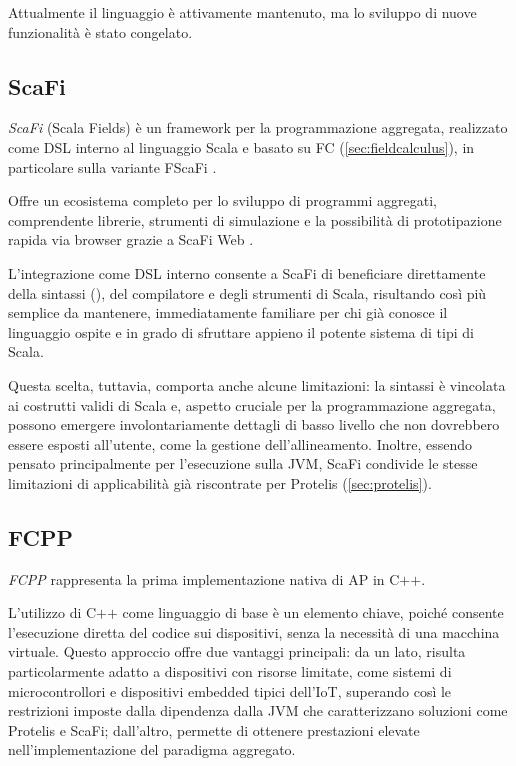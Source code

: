 Attualmente il linguaggio è attivamente mantenuto, ma lo sviluppo di nuove funzionalità è stato congelato.



\subsection{ScaFi}
\label{sec:scafi}

\emph{ScaFi} \cite{scafi} (Scala Fields) è un framework per la programmazione aggregata, realizzato come \ac{DSL} interno al linguaggio Scala e basato su \ac{FC} (\ref{sec:fieldcalculus}), in particolare sulla variante FScaFi \cite{fscafi}.

Offre un ecosistema completo per lo sviluppo di programmi aggregati, comprendente librerie, strumenti di simulazione e la possibilità di prototipazione rapida via browser grazie a ScaFi Web \cite{scafiweb}.

L’integrazione come \ac{DSL} interno consente a ScaFi di beneficiare direttamente della sintassi (), del compilatore e degli strumenti di Scala, risultando così più semplice da mantenere, immediatamente familiare per chi già conosce il linguaggio ospite e in grado di sfruttare appieno il potente sistema di tipi di Scala.

Questa scelta, tuttavia, comporta anche alcune limitazioni: la sintassi è vincolata ai costrutti validi di Scala e, aspetto cruciale per la programmazione aggregata, possono emergere involontariamente dettagli di basso livello che non dovrebbero essere esposti all’utente, come la gestione dell’allineamento. Inoltre, essendo pensato principalmente per l’esecuzione sulla JVM, ScaFi condivide le stesse limitazioni di applicabilità già riscontrate per Protelis (\ref{sec:protelis}).



\subsection{FCPP}
\label{sec:fcpp}

\emph{FCPP} \cite{fcpp} rappresenta la prima implementazione nativa di \ac{AP} in \(\text{C++}\).

L'utilizzo di \(\text{C++}\) come linguaggio di base è un elemento chiave, poiché consente l'esecuzione diretta del codice sui dispositivi, senza la necessità di una macchina virtuale. Questo approccio offre due vantaggi principali: da un lato, risulta particolarmente adatto a dispositivi con risorse limitate, come sistemi di microcontrollori e dispositivi embedded tipici dell'\ac{IoT}, superando così le restrizioni imposte dalla dipendenza dalla JVM che caratterizzano soluzioni come Protelis e ScaFi; dall'altro, permette di ottenere prestazioni elevate nell'implementazione del paradigma aggregato.

